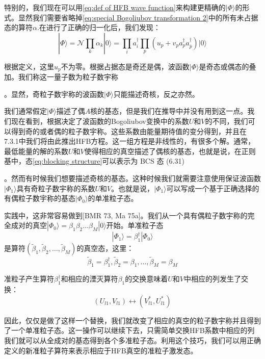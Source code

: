 特别的，我们现在可以用\ref{eq:def of HFB wave function}来构建更精确的$|\Phi\rangle$的形式。显然我们需要省略掉\ref{eq:special Bogoliubov transformation 2}中的所有未占据态的算符$\alpha$.在进行了正确的归一化后，我们发现：
\begin{equation}
|\Phi\rangle=\mathcal{N}\prod_{k}\alpha_{k}|0\rangle=\prod_{i}a^{\dagger}_{i}\prod_{p}(u_{p}+v_{p}a^{\dagger}_{p}a^{\dagger}_{\bar{p}})|0\rangle\label{eq:blocking structure}
\end{equation}

根据定义，这里$u_{p}$不为零。根据占据态是奇还是偶，波函数$|\Phi\rangle$是奇态或偶态的叠加。我们称这一量子数为粒子数宇称

 \cite{BMR73}。显然，奇粒子数宇称的波函数$|\Phi\rangle$只能描述奇核，反之亦然。

我们通常假定$|\Phi\rangle$描述了偶$A$核的基态，但是我们在推导中并没有用到这一点。我们现在看到，根据决定了波函数的Bogoliubov变换中的系数$U$和$V$的不同，我们可以得到奇的或者偶的粒子数宇称。这些系数由能量期待值的变分得到，并且在7.3.1中我们将由此推出HFB方程。这一组方程是非线性的，有很多个解。通常，最低能量的解的系数$U$和$V$使得相应的真空描述了偶核的基态，也就是说，在正则基中，态\ref{eq:blocking structure}可以表示为
BCS 态 (6.31)

。然而有时候我们想要描述奇核的基态。这种时候我们就需要注意使用保证波函数$|\Phi_{1}\rangle$具有奇粒子数宇称的系数$U$和$V$。也就是说，$|\Phi_{1}\rangle$可以写成一个基于正确选择的有偶粒子数宇称的基态$|\Phi_{0}\rangle$的单准粒子态。

实践中，这非常容易做到{[}BMR 73, Ma 75a{]}。我们从一个具有偶粒子数宇称的完全成对的真空$|\Phi_{0}\rangle=\beta_{1}\beta_{2}\dots\beta_{M}|0\rangle$开始。单准粒子态
\[
|\Phi_{1}\rangle=\beta^{\dagger}_{1}|\Phi_{0}\rangle
\]
是算符$(\tilde{\beta}_{1},\tilde{\beta}_{2},\dots,\tilde{\beta}_{M})$的真空态，这里：
\[
\tilde{\beta}_{1}=\beta^{\dagger}_{1},\tilde{\beta}_{2}=\beta_{1},\dots,\tilde{\beta}_{M}=\beta_{M}
\]

准粒子产生算符$\beta^{\dagger}_{1}$和相应的湮灭算符$\beta_{1}$的交换意味着$U$和$V$中相应的列发生了交换：
\begin{equation}
(U_{l1},V_{l1})\leftrightarrow(V^{*}_{l1},U^{*}_{l1})\label{eq:change columns of U V}
\end{equation}

因此，仅仅是做了这样一个替换，我们就改变了相应的真空的粒子数宇称并且得到了一个单准粒子态。这一操作可以继续下去，只需简单交换HFB系数中相应的列我们就可以从全成对的基态得到各个多准粒子态。利用这个技巧，我们可以用正确定义的新准粒子算符来表示相应于HFB真空的准粒子激发态。


